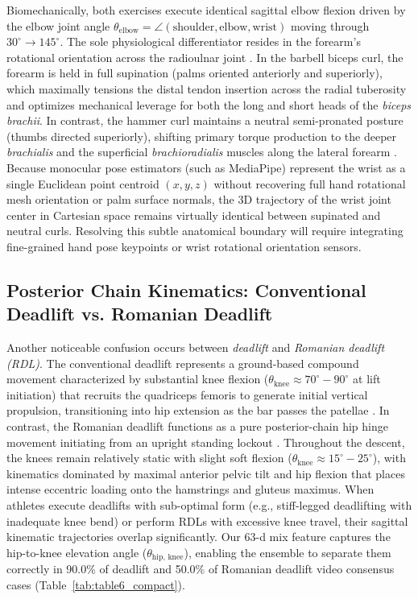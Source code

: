\documentclass[runningheads]{llncs}
\begin{document}
Biomechanically, both exercises execute identical sagittal elbow flexion driven by the elbow joint angle $\theta_{\text{elbow}} = \angle(\text{shoulder}, \text{elbow}, \text{wrist})$ moving through $30^\circ \to 145^\circ$. The sole physiological differentiator resides in the forearm's rotational orientation across the radioulnar joint \cite{oliveira2009,marcolin2018}. In the barbell biceps curl, the forearm is held in full supination (palms oriented anteriorly and superiorly), which maximally tensions the distal tendon insertion across the radial tuberosity and optimizes mechanical leverage for both the long and short heads of the \textit{biceps brachii}. In contrast, the hammer curl maintains a neutral semi-pronated posture (thumbs directed superiorly), shifting primary torque production to the deeper \textit{brachialis} and the superficial \textit{brachioradialis} muscles along the lateral forearm \cite{oliveira2009,marcolin2018}. Because monocular pose estimators (such as MediaPipe) represent the wrist as a single Euclidean point centroid $(x, y, z)$ without recovering full hand rotational mesh orientation or palm surface normals, the 3D trajectory of the wrist joint center in Cartesian space remains virtually identical between supinated and neutral curls. Resolving this subtle anatomical boundary will require integrating fine-grained hand pose keypoints or wrist rotational orientation sensors.

\subsection{Posterior Chain Kinematics: Conventional Deadlift vs. Romanian Deadlift}
Another noticeable confusion occurs between \textit{deadlift} and \textit{Romanian deadlift (RDL)}. The conventional deadlift represents a ground-based compound movement characterized by substantial knee flexion ($\theta_{\text{knee}} \approx 70^\circ-90^\circ$ at lift initiation) that recruits the quadriceps femoris to generate initial vertical propulsion, transitioning into hip extension as the bar passes the patellae \cite{escamilla2000}. In contrast, the Romanian deadlift functions as a pure posterior-chain hip hinge movement initiating from an upright standing lockout \cite{mcallister2014,schoenfeld2010}. Throughout the descent, the knees remain relatively static with slight soft flexion ($\theta_{\text{knee}} \approx 15^\circ-25^\circ$), with kinematics dominated by maximal anterior pelvic tilt and hip flexion that places intense eccentric loading onto the hamstrings and gluteus maximus. When athletes execute deadlifts with sub-optimal form (e.g., stiff-legged deadlifting with inadequate knee bend) or perform RDLs with excessive knee travel, their sagittal kinematic trajectories overlap significantly. Our 63-d mix feature captures the hip-to-knee elevation angle ($\theta_{\text{hip, knee}}$), enabling the ensemble to separate them correctly in 90.0\% of deadlift and 50.0\% of Romanian deadlift video consensus cases (Table~\ref{tab:table6_compact}).
\end{document}
